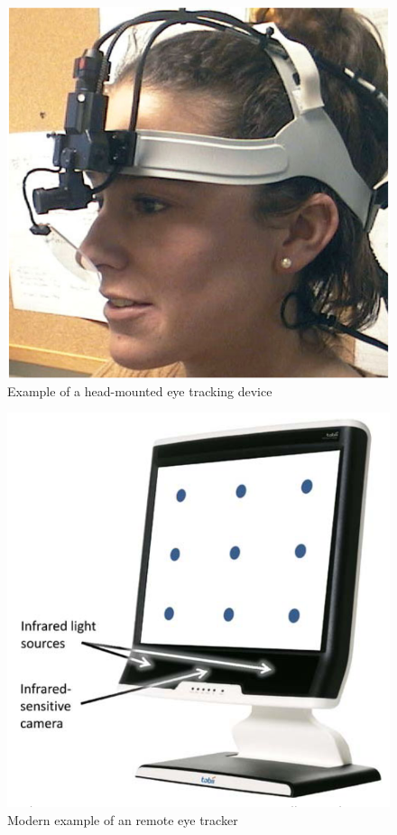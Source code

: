 \begin{figure}[!ht]
    \centering
    \includegraphics[width=0.75\linewidth]{images/headmounted_goldberg2002eye.png}
    \caption{
        Example of a head-mounted eye tracking device \autocite[12]{goldberg2002eye}
    }
    \label{figure:HeadMounted}
\end{figure}

\begin{figure}[!ht]
    \centering
    \includegraphics[width=0.75\linewidth]{images/remote_biedert2010eyebook.png}
    \caption{
        Modern example of an remote eye tracker \autocite[274]{biedert2010eyebook}
    }
    \label{figure:Remote}
\end{figure}

